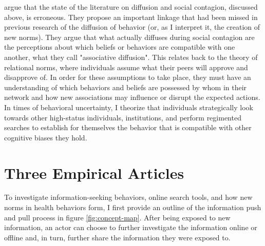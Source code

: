 \citet{goldbergSocialContagionAssociative2018} argue that the state of the
literature on diffusion and social contagion, discussed above, is erroneous.
They propose an important linkage that had been missed in previous research of
the diffusion of behavior (or, as I interpret it, the creation of new norms).
They argue that what actually diffuses during social contagion are the
perceptions about which beliefs or behaviors are compatible with one another,
what they call "associative diffusion". 
This relates back to the theory of relational norms, where individuals assume
what their peers will approve and disapprove of. In order for these assumptions 
to take place, they must have an understanding of which behaviors and beliefs
are possessed by whom in their network and how new associations may influence
or disrupt the expected actions. In times of behavioral uncertainty, I
theorize that individuals strategically look towards other high-status
individuals, institutions, and perform regimented searches to establish for
themselves the behavior that is compatible with other cognitive biases they
hold.

\section{Three Empirical Articles}

To investigate information-seeking behaviors, online search tools, and how
new norms in health behaviors form, I first provide an outline of the 
information push and pull process in figure \ref{fig:concept-map}. After 
being exposed to new information, an actor can choose to further investigate
the information online or offline and, in turn, further share the 
information they were exposed to. 

